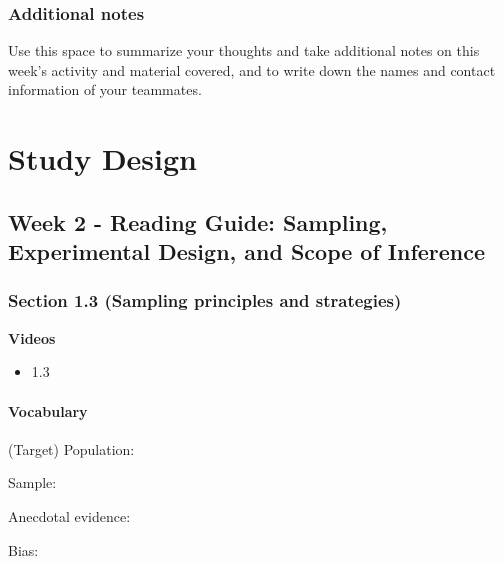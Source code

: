 \documentclass[
]{report}
\providecommand{\tightlist}{%
  \setlength{\itemsep}{0pt}\setlength{\parskip}{0pt}}
\newcommand{\rgs}{\vspace{12pt}} %
\begin{document}
\hypertarget{additional-notes}{%
\subsection{Additional notes}\label{additional-notes}}

Use this space to summarize your thoughts and take additional notes on this week's activity and material covered, and to write down the names and contact information of your teammates.

\hypertarget{study-design}{%
\chapter{Study Design}\label{study-design}}

\hypertarget{week-2---reading-guide-sampling-experimental-design-and-scope-of-inference}{%
\section{Week 2 - Reading Guide: Sampling, Experimental Design, and Scope of Inference}\label{week-2---reading-guide-sampling-experimental-design-and-scope-of-inference}}

\hypertarget{section-1.3-sampling-principles-and-strategies}{%
\subsection*{Section 1.3 (Sampling principles and strategies)}\label{section-1.3-sampling-principles-and-strategies}}

\textbf{Videos}

\begin{itemize}
\tightlist
\item
  1.3
\end{itemize}


\hypertarget{vocabulary-1}{%
\subsubsection*{Vocabulary}\label{vocabulary-1}}

(Target) Population:
\rgs

Sample:
\rgs

Anecdotal evidence:
\rgs

Bias:
\rgs
\end{document}
